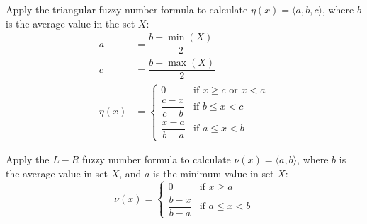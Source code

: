 \documentclass[graybox]{svmult}
\begin{document}
\begin{enumerate}[label=(\roman*), itemsep=1em]
          Apply the triangular fuzzy number formula to calculate \( \eta(x) = \langle a, b, c \rangle \), where \( b \) is the average value in the set \( X \):
          \begin{align}
              a       & = \dfrac{b + \min(X)}{2}                                          \\[6pt]
              c       & = \dfrac{b + \max(X)}{2}                                          \\[6pt]
              \eta(x) & = \begin{cases}
                              0                & \text{if } x \geq c \text{ or } x < a \\
                              \dfrac{c-x}{c-b} & \text{if } b \leq x < c               \\[6pt]
                              \dfrac{x-a}{b-a} & \text{if } a \leq x < b
                          \end{cases}
          \end{align}


          Apply the \( L - R \) fuzzy number formula to calculate \( \nu(x) = \langle a, b \rangle \), where \( b \) is the average value in set \( X \), and \( a \) is the minimum value in set \( X \):
          \begin{equation}
              \nu(x) = \begin{cases}
                  0                & \text{if } x \geq a     \\
                  \dfrac{b-x}{b-a} & \text{if } a \leq x < b
              \end{cases}
          \end{equation}

\end{enumerate}
\end{document}
